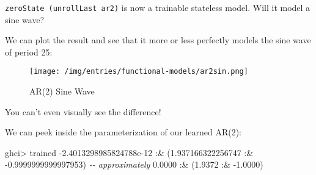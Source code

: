 \documentclass[]{article}
\newenvironment{Shaded}{}{}
\newcommand{\CommentTok}[1]{\textcolor[rgb]{0.38,0.63,0.69}{\textit{#1}}}
\newcommand{\DataTypeTok}[1]{\textcolor[rgb]{0.56,0.13,0.00}{#1}}
\newcommand{\DecValTok}[1]{\textcolor[rgb]{0.25,0.63,0.44}{#1}}
\newcommand{\FloatTok}[1]{\textcolor[rgb]{0.25,0.63,0.44}{#1}}
\newcommand{\FunctionTok}[1]{\textcolor[rgb]{0.02,0.16,0.49}{#1}}
\newcommand{\KeywordTok}[1]{\textcolor[rgb]{0.00,0.44,0.13}{\textbf{#1}}}
\newcommand{\NormalTok}[1]{#1}
\newcommand{\OperatorTok}[1]{\textcolor[rgb]{0.40,0.40,0.40}{#1}}
\newcommand{\OtherTok}[1]{\textcolor[rgb]{0.00,0.44,0.13}{#1}}
\begin{document}
\texttt{zeroState\ (unrollLast\ ar2)} is now a trainable stateless model. Will
it model a sine wave?

\begin{Shaded}
\end{Shaded}

We can plot the result and see that it more or less perfectly models the sine
wave of period 25:

\begin{figure}
\centering
\texttt{[image: /img/entries/functional-models/ar2sin.png]}
\caption{AR(2) Sine Wave}
\end{figure}

You can't even visually see the difference!

We can peek inside the parameterization of our learned AR(2):

\begin{Shaded}
\begin{Highlighting}[]
\NormalTok{ghci}\OperatorTok{\textgreater{}}\NormalTok{ trained}
\OperatorTok{{-}}\FloatTok{2.4013298985824788e{-}12} \OperatorTok{:\&}\NormalTok{ (}\FloatTok{1.937166322256747} \OperatorTok{:\&} \OperatorTok{{-}}\FloatTok{0.9999999999997953}\NormalTok{)}
\CommentTok{{-}{-} approximately}
\FloatTok{0.0000} \OperatorTok{:\&}\NormalTok{ (}\FloatTok{1.9372} \OperatorTok{:\&} \OperatorTok{{-}}\FloatTok{1.0000}\NormalTok{)}
\end{Highlighting}
\end{Shaded}
\end{document}
